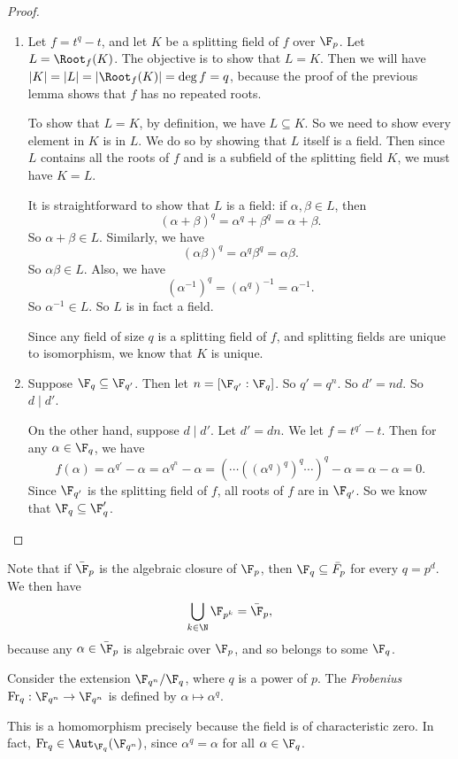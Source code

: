 \documentclass[a4paper]{article}
\newcommand\Fr{\mathrm{Fr}}
\begin{document}
\begin{proof}\leavevmode
  \begin{enumerate}
    \item Let $f = t^q - t$, and let $K$ be a splitting field of $f$ over $\F_p$. Let $L = \Root_f(K)$. The objective is to show that $L = K$. Then we will have $|K| = |L| = |\Root_f(K)| = \deg f = q$, because the proof of the previous lemma shows that $f$ has no repeated roots.

      To show that $L = K$, by definition, we have $L \subseteq K$. So we need to show every element in $K$ is in $L$. We do so by showing that $L$ itself is a field. Then since $L$ contains all the roots of $f$ and is a subfield of the splitting field $K$, we must have $K = L$.

      It is straightforward to show that $L$ is a field: if $\alpha, \beta \in L$, then
      \[
        (\alpha + \beta)^q = \alpha^q + \beta^q = \alpha + \beta.
      \]
      So $\alpha + \beta \in L$. Similarly, we have
      \[
        (\alpha\beta)^q = \alpha^q \beta^q = \alpha\beta.
      \]
      So $\alpha\beta \in L$. Also, we have
      \[
        (\alpha^{-1})^q = (\alpha^q)^{-1} = \alpha^{-1}.
      \]
      So $\alpha^{-1} \in L$. So $L$ is in fact a field.

      Since any field of size $q$ is a splitting field of $f$, and splitting fields are unique to isomorphism, we know that $K$ is unique.
    \item Suppose $\F_q \subseteq \F_{q'}$. Then let $n = [\F_{q'}: \F_q]$. So $q' = q^n$. So $d'= nd$. So $d \mid d'$.

      On the other hand, suppose $d \mid d'$. Let $d' = dn$. We let $f = t^{q'} - t$. Then for any $\alpha \in \F_q$, we have
      \[
        f(\alpha) = \alpha^{q'} - \alpha = \alpha^{q^n} - \alpha = (\cdots ((\alpha^q)^q)^q\cdots )^q - \alpha = \alpha - \alpha = 0.
      \]
      Since $\F_{q'}$ is the splitting field of $f$, all roots of $f$ are in $\F_{q'}$. So we know that $\F_q \subseteq \F_q'$.
  \end{enumerate}
\end{proof}
Note that if $\bar{\F}_p$ is the algebraic closure of $\F_p$, then $\F_q \subseteq \bar{F}_p$ for every $q = p^d$. We then have
\[
  \bigcup_{k \in \N} \F_{p^k} = \bar{\F}_p,
\]
because any $\alpha \in \bar{\F}_p$ is algebraic over $\F_p$, and so belongs to some $\F_q$.

\begin{defi}
  Consider the extension $\F_{q^n}/\F_q$, where $q$ is a power of $p$. The \emph{Frobenius} $\Fr_q: \F_{q^n} \to \F_{q^n}$ is defined by $\alpha\mapsto \alpha^q$.
\end{defi}
This is a homomorphism precisely because the field is of characteristic zero. In fact, $\Fr_q \in \Aut_{\F_q} (\F_{q^n})$, since $\alpha^q = \alpha$ for all $\alpha \in \F_q$.
\end{document}
